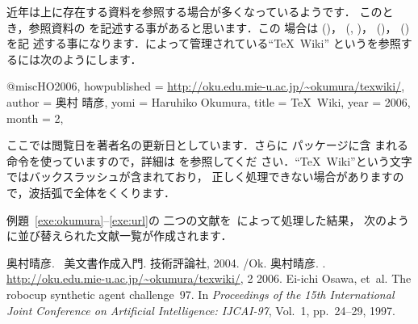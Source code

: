\begin{Exe}
\label{exe:url}
近年は上に存在する資料を参照する場合が多くなっているようです．
このとき，参照資料の  を記述する事があると思います．この
場合は  ()， (,
)， ()， ()を記
述する事になります．によって管理されている``\TeX~Wiki''
というを参照するには次のようにします．

\begin{InText}
@misc{HO2006,
 howpublished = {\url{http://oku.edu.mie-u.ac.jp/~okumura/texwiki/}}, 
 author    = {奥村 晴彦}, 
 yomi      = {Haruhiko Okumura},
 title     = {{\TeX\ Wiki}},
 year      = 2006, 
 month     = 2,
}   
\end{InText}

ここでは閲覧日を著者名の更新日としています．さらに パッケージに含
まれる  命令を使っていますので，詳細は を参照してくだ
さい．``\TeX~Wiki''という文字ではバックスラッシュが含まれており，
正しく処理できない場合がありますので，波括弧で全体をくくります．
\end{Exe}

例題~\ref{exe:okumura}--\ref{exe:url}の
二つの文献を\JBibTeX\ によって処理した結果，
次のように並び替えられた文献一覧が作成されます．

\begin{InText}
\begin{thebibliography}{9}
 奥村晴彦.
 \newblock [改訂第3版] \LaTeXe\ 美文書作成入門.
 \newblock 技術評論社, 2004.
 /Ok.
 奥村晴彦.
 .
 \newblock \url{http://oku.edu.mie-u.ac.jp/~okumura/texwiki/}, 
   2 2006.
 Ei-ichi Osawa, et~al.
 \newblock The robocup synthetic agent challenge~97.
 \newblock In {\em Proceedings of the 15th International Joint 
   Conference on Artificial Intelligence: IJCAI-97}, Vol.~1, 
   pp.~24--29, 1997.
\end{thebibliography} 
\end{InText}

